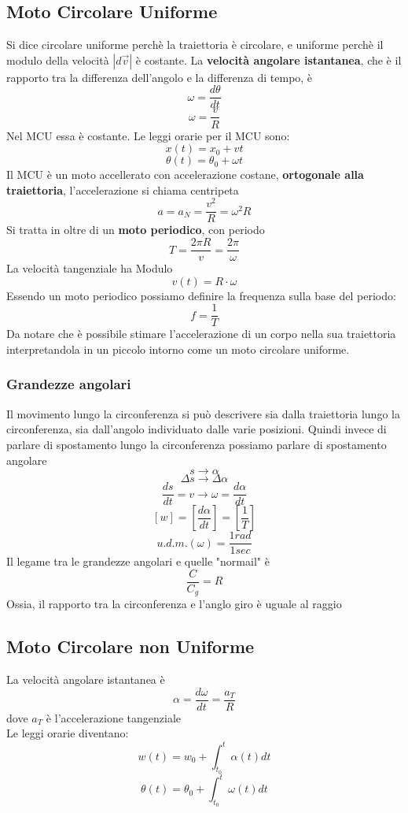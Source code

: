 \documentclass[a4paper]{report}
\begin{document}
  \subsection{Moto Circolare Uniforme}
  Si dice circolare uniforme perchè la traiettoria è circolare, e uniforme perchè il modulo della velocità $|d\vec{v}|$ è costante.
  La \textbf{velocità angolare istantanea}, che è il rapporto tra la differenza dell'angolo e la differenza di tempo, è
  $$ \omega = \frac{d\theta}{dt} $$
  $$ \omega = \frac{v}{R} $$
  Nel MCU essa è costante. Le leggi orarie per il MCU sono:
  $$ x(t) =x_0 + vt$$
  $$ \theta(t) = \theta_0 + \omega t$$
  Il MCU è un moto accellerato con accelerazione costane, \textbf{ortogonale alla traiettoria}, l'accelerazione si chiama centripeta
  $$ a= a_N = \frac{v^2}{R} = \omega^2 R$$
  Si tratta in oltre di un \textbf{moto periodico}, con periodo
  $$ T=\frac{2\pi R}{v} = \frac{2\pi}{\omega} $$
  La velocità tangenziale ha Modulo
  $$ v(t) = R \cdot \omega $$
  Essendo un moto periodico possiamo definire la frequenza sulla base del periodo:
  $$ f = \frac{1}{T}$$
  Da notare che è possibile stimare l'accelerazione di un corpo nella sua traiettoria interpretandola in un piccolo intorno come un moto circolare uniforme.
  \subsubsection{Grandezze angolari}
  Il movimento lungo la circonferenza si può descrivere sia dalla traiettoria lungo la circonferenza, sia dall'angolo individuato dalle varie posizioni. Quindi invece di parlare di spostamento lungo la circonferenza possiamo parlare di spostamento angolare
  $$ s \rightarrow \alpha$$
  $$ \Delta s \rightarrow \Delta \alpha$$
  $$ \frac{ds}{dt} = v \rightarrow \omega = \frac{d\alpha}{dt}$$
  $$[w] = [\frac{d\alpha}{dt}] = [\frac{1}{T}]$$
  $$ u.d.m.(\omega) = \frac{1 rad}{1 sec}$$
  Il legame tra le grandezze angolari e quelle "normail" è
  $$\frac{C}{C_g} = R$$
  Ossia, il rapporto tra la circonferenza e l'anglo giro è uguale al raggio

  \subsection{Moto Circolare non Uniforme}
  La velocità angolare istantanea è
  $$ \alpha = \frac{d\omega}{dt} = \frac{a_T}{R} $$
  dove $a_T$ è l'accelerazione tangenziale\\
  Le leggi orarie diventano:
  $$ w(t) = w_0 + \int_{t_0}^t \alpha(t) dt $$
  $$ \theta(t) = \theta_0 + \int_{t_0}^t \omega(t) dt $$
\end{document}
